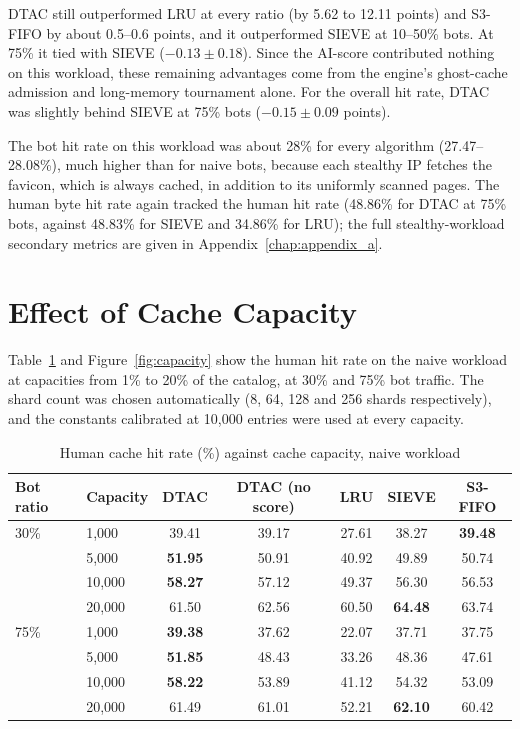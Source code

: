 DTAC still outperformed LRU at every ratio (by 5.62 to 12.11 points) and S3-FIFO by about 0.5--0.6 points, and it outperformed SIEVE at 10--50\% bots. At 75\% it tied with SIEVE ($-0.13 \pm 0.18$). Since the AI-score contributed nothing on this workload, these remaining advantages come from the engine's ghost-cache admission and long-memory tournament alone. For the overall hit rate, DTAC was slightly behind SIEVE at 75\% bots ($-0.15 \pm 0.09$ points).

The bot hit rate on this workload was about 28\% for every algorithm (27.47--28.08\%), much higher than for naive bots, because each stealthy IP fetches the favicon, which is always cached, in addition to its uniformly scanned pages. The human byte hit rate again tracked the human hit rate (48.86\% for DTAC at 75\% bots, against 48.83\% for SIEVE and 34.86\% for LRU); the full stealthy-workload secondary metrics are given in Appendix~\ref{chap:appendix_a}.

\section{Effect of Cache Capacity}
Table~\ref{tab:capacity} and Figure~\ref{fig:capacity} show the human hit rate on the naive workload at capacities from 1\% to 20\% of the catalog, at 30\% and 75\% bot traffic. The shard count was chosen automatically (8, 64, 128 and 256 shards respectively), and the constants calibrated at 10{,}000 entries were used at every capacity.

\begin{table}[htbp]
    \centering
    \caption{Human cache hit rate (\%) against cache capacity, naive workload}
    \label{tab:capacity}
    \small
    \begin{tabular}{llccccc}
        \toprule
        Bot ratio & Capacity & DTAC & DTAC (no score) & LRU & SIEVE & S3-FIFO \\
        \midrule
        30\% & 1{,}000 & 39.41 & 39.17 & 27.61 & 38.27 & \textbf{39.48} \\
         & 5{,}000 & \textbf{51.95} & 50.91 & 40.92 & 49.89 & 50.74 \\
         & 10{,}000 & \textbf{58.27} & 57.12 & 49.37 & 56.30 & 56.53 \\
         & 20{,}000 & 61.50 & 62.56 & 60.50 & \textbf{64.48} & 63.74 \\
        \midrule
        75\% & 1{,}000 & \textbf{39.38} & 37.62 & 22.07 & 37.71 & 37.75 \\
         & 5{,}000 & \textbf{51.85} & 48.43 & 33.26 & 48.36 & 47.61 \\
         & 10{,}000 & \textbf{58.22} & 53.89 & 41.12 & 54.32 & 53.09 \\
         & 20{,}000 & 61.49 & 61.01 & 52.21 & \textbf{62.10} & 60.42 \\
        \bottomrule
    \end{tabular}
\end{table}

